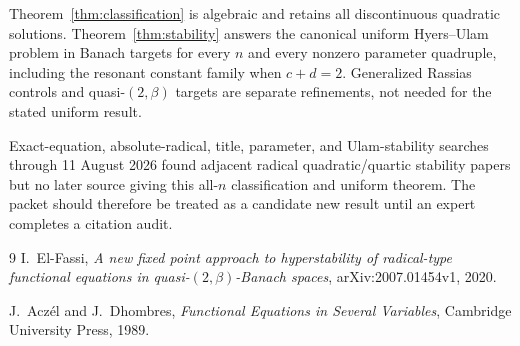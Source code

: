 \documentclass[11pt]{article}
\begin{document}
Theorem~\ref{thm:classification} is algebraic and retains all discontinuous
quadratic solutions.  Theorem~\ref{thm:stability} answers the canonical
uniform Hyers--Ulam problem in Banach targets for every $n$ and every
nonzero parameter quadruple, including the resonant constant family when
$c+d=2$.  Generalized Rassias controls and quasi-$(2,\beta)$ targets are
separate refinements, not needed for the stated uniform result.

Exact-equation, absolute-radical, title, parameter, and Ulam-stability
searches through 11 August 2026 found adjacent radical quadratic/quartic
stability papers but no later source giving this all-$n$ classification and
uniform theorem.  The packet should therefore be treated as a candidate new
result until an expert completes a citation audit.

\begin{thebibliography}{9}
I.~El-Fassi,
\emph{A new fixed point approach to hyperstability of radical-type
functional equations in quasi-$(2,\beta)$-Banach spaces},
arXiv:2007.01454v1, 2020.

J.~Acz\'{e}l and J.~Dhombres,
\emph{Functional Equations in Several Variables}, Cambridge University
Press, 1989.
\end{thebibliography}
\end{document}
